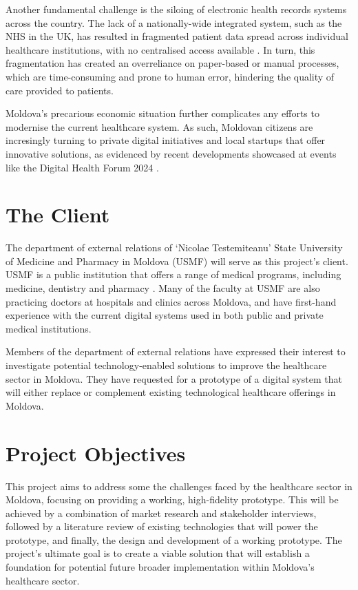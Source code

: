 Another fundamental challenge is the siloing of electronic health records systems across the country. The lack of a nationally-wide integrated system, such as the NHS in the UK, has resulted in fragmented patient data spread across individual healthcare institutions, with no centralised access available \parencite{mdehr}. In turn, this fragmentation has created an overreliance on paper-based or manual processes, which are time-consuming and prone to human error, hindering the quality of care provided to patients.

Moldova's precarious economic situation further complicates any efforts to modernise the current healthcare system. As such, Moldovan citizens are incresingly turning to private digital initiatives and local startups that offer innovative solutions, as evidenced by recent developments showcased at events like the Digital Health Forum 2024 \parencite{mdstartup}.

\section{The Client}

The department of external relations of `Nicolae Testemiteanu' State University of Medicine and Pharmacy in Moldova (USMF) will serve as this project's client. USMF is a public institution that offers a range of medical programs, including medicine, dentistry and pharmacy \parencite{mduni}. Many of the faculty at USMF are also practicing doctors at hospitals and clinics across Moldova, and have first-hand experience with the current digital systems used in both public and private medical institutions.

Members of the department of external relations have expressed their interest to investigate potential technology-enabled solutions to improve the healthcare sector in Moldova. They have requested for a prototype of a digital system that will either replace or complement existing technological healthcare offerings in Moldova. 

\section{Project Objectives}\label{sec:objectives}

This project aims to address some the challenges faced by the healthcare sector in Moldova, focusing on providing a working, high-fidelity prototype. This will be achieved by a combination of market research and stakeholder interviews, followed by a literature review of existing technologies that will power the prototype, and finally, the design and development of a working prototype. The project's ultimate goal is to create a viable solution that will establish a foundation for potential future broader implementation within Moldova's healthcare sector.


